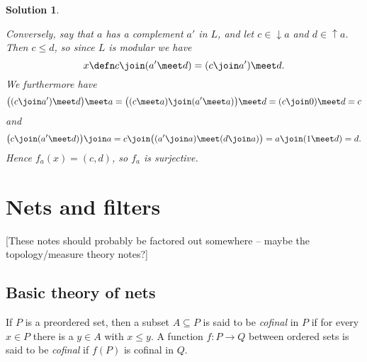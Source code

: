 \documentclass[article, a4paper, 11pt, oneside]{memoir}
\numberwithin{equation}{chapter}
\newcommand{\calT}{\mathcal{T}}
\theoremstyle{nonumberplain}
\newtheorem{solution}{Solution}
\newcommand{\upset}{\operatorname{\uparrow}}
\newcommand{\downset}{\operatorname{\downarrow}}
\begin{document}
\begin{solution}
\begin{solutionsec}
    Conversely, say that $a$ has a complement $a'$ in $L$, and let $c \in \downset a$ and $d \in \upset a$. Then $c \leq d$, so since $L$ is modular we have
    \begin{equation*}
        x
            \defn c \join (a' \meet d)
            = (c \join a') \meet d.
    \end{equation*}
    We furthermore have
    \begin{equation*}
        \bigl( (c \join a') \meet d \bigr) \meet a
            = \bigl( (c \meet a) \join (a' \meet a) \bigr) \meet d
            = (c \join 0) \meet d
            = c
    \end{equation*}
    and
    \begin{equation*}
        \bigl( c \join (a' \meet d ) \bigr) \join a
            = c \join \bigl( (a' \join a) \meet (d \join a) \bigr)
            = a \join (1 \meet d)
            = d.
    \end{equation*}
    Hence $f_a(x) = (c,d)$, so $f_a$ is surjective.
\end{solutionsec}
\end{solution}


\chapter{Nets and filters}

[These notes should probably be factored out somewhere -- maybe the topology/measure theory notes?]

\section{Basic theory of nets}

If $P$ is a preordered set, then a subset $A \subseteq P$ is said to be \emph{cofinal} in $P$ if for every $x \in P$ there is a $y \in A$ with $x \leq y$. A function $f \colon P \to Q$ between ordered sets is said to be \emph{cofinal} if $f(P)$ is cofinal in $Q$.


\newcommand{\mynet}{u}
\newcommand{\subnet}{v}
\newcommand{\altnet}{v}
\newcommand{\newnet}{w}
\newcommand{\mylimit}{x}
\newcommand{\calN}{\mathcal{N}}
\newcommand{\nhoods}[1]{\calN_{#1}}
\newcommand{\tail}[2][]{T^{#1}_{#2}}
\newcommand{\tails}[1]{\calT_{#1}}
\end{document}
